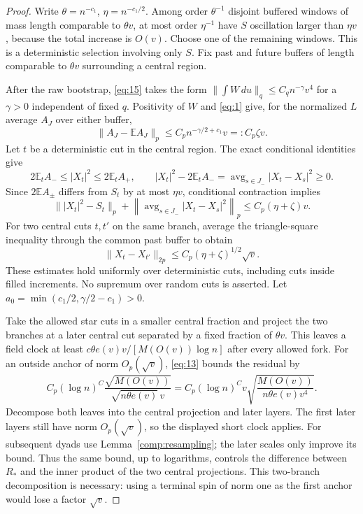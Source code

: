 \begin{proof}
Write $\theta=n^{-c_1}$, $\eta=n^{-c_1/2}$.  Among order
$\theta^{-1}$ disjoint buffered windows of mass length comparable to
$\theta v$, at most order $\eta^{-1}$ have $S$ oscillation larger
than $\eta v$, because the total increase is $O(v)$.  Choose one of
the remaining windows.  This is a deterministic selection involving
only $S$.  Fix past and future buffers of length comparable to
$\theta v$ surrounding a central region.

After the raw bootstrap, \eqref{eq:15} takes the form
$\|\int W\,du\|_q\le C_q n^{-\gamma}v^4$ for a $\gamma>0$
independent of fixed $q$.  Positivity of $W$ and \eqref{eq:1} give,
for the normalized $L$ average $A_J$ over either buffer,
\[
 \|A_J-\mathbb EA_J\|_p
 \le C_p n^{-\gamma/2+c_1}v=:C_p\zeta v.
\]
Let $t$ be a deterministic cut in the central region.  The exact
conditional identities give
\[
 2\mathbb E_t A_-\le|X_t|^2\le2\mathbb E_t A_+,
 \qquad
 |X_t|^2-2\mathbb E_t A_-
   =\operatorname{avg}_{s\in J_-}|X_t-X_s|^2\ge0.
\]
Since $2\mathbb EA_\pm$ differs from $S_t$ by at most $\eta v$,
conditional contraction implies
\[
 \||X_t|^2-S_t\|_p+
 \left\|\operatorname{avg}_{s\in J_-}|X_t-X_s|^2\right\|_p
 \le C_p(\eta+\zeta)v.
\]
For two central cuts $t,t'$ on the same branch, average the
triangle-square inequality through the common past buffer to obtain
\[
 \|X_t-X_{t'}\|_{2p}
 \le C_p(\eta+\zeta)^{1/2}\sqrt v.
\]
These estimates hold uniformly over deterministic cuts, including cuts
inside filled increments.  No supremum over random cuts is asserted.
Let $a_0=\min(c_1/2,\gamma/2-c_1)>0$.

Take the allowed star cuts in a smaller central fraction and project
the two branches at a later central cut separated by a fixed fraction
of $\theta v$.  This leaves a field clock at least
$c\theta e(v)v/[M(O(v))\log n]$ after every allowed fork.
For an outside anchor of norm $O_p(\sqrt v)$, \eqref{eq:13} bounds
the residual by
\[
 C_p(\log n)^C\frac{\sqrt{M(O(v))}}{\sqrt{n\theta e(v)}\,v}
 = C_p(\log n)^C v
       \sqrt{\frac{M(O(v))}{n\theta e(v)v^4}}.
\]
Decompose both leaves into the central projection and later layers.
The first later layers still have norm $O_p(\sqrt v)$, so the displayed
short clock applies.  For subsequent dyads use
Lemma~\ref{comp:resampling}; the later scales only improve its bound.
Thus the same bound, up to logarithms, controls the difference between
$R_*$ and the inner product of the two central projections.  This
two-branch decomposition is necessary: using a terminal spin of norm
one as the first anchor would lose a factor $\sqrt v$.


\end{proof}
